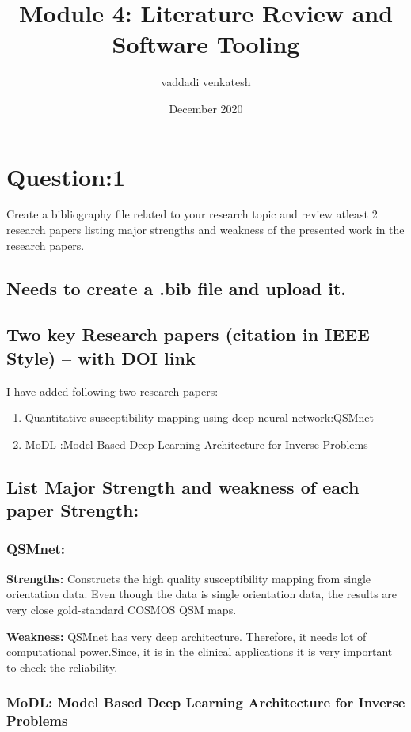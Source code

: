 \documentclass{article}
\title{Module 4: Literature Review and Software Tooling}
\author{vaddadi venkatesh }
\date{December 2020}
\begin{document}
\maketitle

\section{Question:1}
Create a bibliography file related to your research topic and review atleast 2 research papers listing major strengths and weakness of the presented work in the research papers.
\subsection{ Needs to create a .bib file and upload it.}
\subsection{Two key Research papers (citation in IEEE Style) – with DOI link}
I have added following two research papers:

\begin{enumerate}
  \item Quantitative susceptibility mapping using deep neural network:QSMnet \cite{qsm}
  
  \item MoDL \cite{modl} :Model Based Deep Learning Architecture for Inverse Problems
\end{enumerate}

\subsection{ List Major Strength and weakness of each paper
    Strength:}
    
    
\subsubsection{QSMnet:}


\textbf{Strengths:}
Constructs the high quality susceptibility mapping from single orientation data. Even though the data is single orientation data, the results are very close gold-standard COSMOS QSM maps.

\textbf{Weakness:}
QSMnet has very deep architecture. Therefore, it needs lot of computational power.Since, it is in the clinical applications it is very important to check the reliability.

\subsubsection{MoDL: Model Based Deep Learning Architecture
for Inverse Problems}
\end{document}
